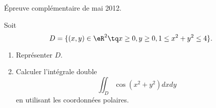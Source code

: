 
\begin{exercice}\label{exoOutilsMath-0145}

    Épreuve complémentaire de mai 2012.

    Soit
    \begin{equation}
        D=\{ (x,y)\in \eR^2\tq x\geq 0,y\geq 0,1\leq x^2+y^2\leq 4 \}.
    \end{equation}
    \begin{enumerate}
        \item
            Représenter \( D\).
        \item
            Calculer l'intégrale double
            \begin{equation}
                \iint_D\cos(x^2+y^2)dxdy
            \end{equation}
            en utilisant les coordonnées polaires.
    \end{enumerate}

\end{exercice}
